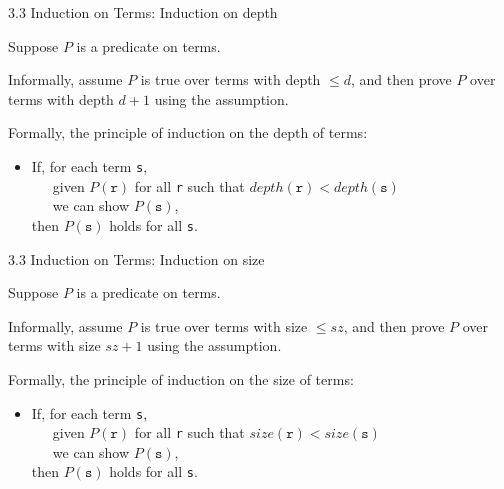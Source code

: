 \documentclass[table]{beamer}
\begin{document}
\begin{frame}[t]{3.3 Induction on Terms: Induction on depth} 

Suppose $P$ is a predicate on terms. 

\vspace{10pt}

Informally, assume $P$ is true over terms with depth $\leq d$, and then prove $P$ over terms with depth $d+1$ using the assumption.


\vspace{10pt}

Formally, {\color{red} the principle of induction on the depth of terms}:
\begin{itemize}
\item If, for each term \texttt{s}, \\
 \ \ \ given $P(\texttt{r})$ for all \texttt{r} such that $depth(\texttt{r})<depth(\texttt{s})$ \\
 \ \ \ we can show $P(\texttt{s})$, \\
 then $P(\texttt{s})$ holds for all \texttt{s}.
\end{itemize}

\end{frame}

\begin{frame}[t]{3.3 Induction on Terms: Induction on size} 

Suppose $P$ is a predicate on terms. 

\vspace{10pt}

Informally, assume $P$ is true over terms with size $\leq sz$, and then prove $P$ over terms with size $sz+1$ using the assumption.


\vspace{10pt}

Formally, {\color{red} the principle of induction on the size of terms}:
\begin{itemize}
\item If, for each term \texttt{s}, \\
 \ \ \ given $P(\texttt{r})$ for all \texttt{r} such that $size(\texttt{r})<size(\texttt{s})$ \\
 \ \ \ we can show $P(\texttt{s})$, \\
 then $P(\texttt{s})$ holds for all \texttt{s}.
\end{itemize}

\end{frame}
\end{document}
